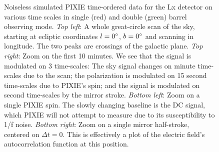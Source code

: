 \documentclass{article}
\begin{document}
\begin{figure}
\begin{tabular}{cc}
	\end{tabular}
	\caption{Noiseless simulated PIXIE time-ordered data for the Lx
	detector on various time scales in single (red) and double (green)
	barrel observing mode. \emph{Top left}: A whole great-circle
	scan of the sky, starting at ecliptic coordinates $l=0\degree$,
	$b=0\degree$ and scanning in longitude. The two peaks are crossings
	of the galactic plane. \emph{Top right}: Zoom on the first 10 minutes.
	We see that the signal is modulated on 3 time-scales: The sky signal
	changes on minute time-scales due to the scan; the polarization is
	modulated on 15 second time-scales due to PIXIE's spin; and the
	signal is modulated on second time-scales by the mirror stroke.
	\emph{Bottom left}: Zoom on a single PIXIE spin. The slowly
	changing baseline is the DC signal, which PIXIE will not attempt
	to measure due to its susceptibility to 1/f noise. \emph{Bottom
	right}: Zoom on a single mirror half-stroke, centered on
	$\Delta t=0$. This is effectively a plot of the electric field's
	autocorrelation function at this position.}
	\label{fig:tod}
\end{figure}
\end{document}

